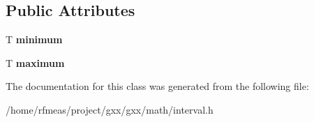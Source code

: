 \subsection*{Public Attributes}
\begin{DoxyCompactItemize}
\item 
T {\bfseries minimum}\hypertarget{classgxx_1_1math_1_1interval_ad4bfbaf34a2d08962d6bd290b98fa3ac}{}\label{classgxx_1_1math_1_1interval_ad4bfbaf34a2d08962d6bd290b98fa3ac}

\item 
T {\bfseries maximum}\hypertarget{classgxx_1_1math_1_1interval_a4273de52ac67e6ac4703f1b3590e3256}{}\label{classgxx_1_1math_1_1interval_a4273de52ac67e6ac4703f1b3590e3256}

\end{DoxyCompactItemize}


The documentation for this class was generated from the following file\+:\begin{DoxyCompactItemize}
\item 
/home/rfmeas/project/gxx/gxx/math/interval.\+h\end{DoxyCompactItemize}
